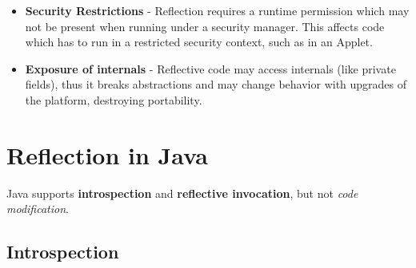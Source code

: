 \begin{itemize}
{\begin{itemize}
        \end{itemize}
    }
    \item \textbf{Security Restrictions} - Reflection requires a runtime permission which may not be present when
    running under a security manager. This affects code which has to run in a
    restricted security context, such as in an Applet.
    \item \textbf{Exposure of internals} - Reflective code may access internals (like private fields), thus it breaks
    abstractions and may change behavior with upgrades of the platform,
    destroying portability.
\end{itemize}

\section{Reflection in Java}
Java supports \textbf{introspection} and \textbf{reflective invocation},
but not \textit{code modification}.

\subsection{Introspection}

